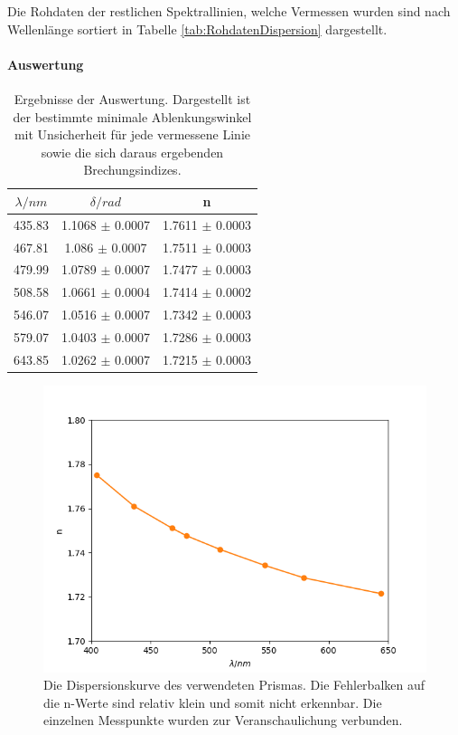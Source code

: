 \documentclass[12pt,a4paper]{article}
\begin{document}
	
	Die Rohdaten der restlichen Spektrallinien, welche Vermessen wurden sind nach Wellenlänge sortiert in Tabelle \ref{tab:RohdatenDispersion} dargestellt.
	
	
	\paragraph{Auswertung}
	
	\begin{table}
		\begin{center}
			\begin{tabular}{|c|c|c|}
				\hline
				$\lambda /nm$ & $\delta /rad$ & n \\
				\hline
				435.83 & 1.1068 $\pm$ 0.0007 & 1.7611 $\pm$ 0.0003 \\ 
				\hline
				467.81 & 1.086 $\pm$ 0.0007 & 1.7511 $\pm$ 0.0003 \\
				\hline
				479.99 & 1.0789 $\pm$ 0.0007 & 1.7477 $\pm$ 0.0003 \\
				\hline
				508.58 & 1.0661 $\pm$ 0.0004 & 1.7414 $\pm$ 0.0002 \\
				\hline
				546.07 & 1.0516 $\pm$ 0.0007 & 1.7342 $\pm$ 0.0003 \\
				\hline
				579.07 & 1.0403 $\pm$ 0.0007 & 1.7286 $\pm$ 0.0003 \\
				\hline
				643.85 & 1.0262 $\pm$ 0.0007 & 1.7215 $\pm$ 0.0003 \\ 
				\hline
			\end{tabular}
			\caption{Ergebnisse der Auswertung. Dargestellt ist der bestimmte minimale Ablenkungswinkel mit Unsicherheit für jede vermessene Linie sowie die sich daraus ergebenden Brechungsindizes.}
			\label{tab:AuswertungDispersion}
		\end{center}
	\end{table}
	
	\begin{figure}
		\includegraphics[scale=1.0]{Bilder/Dispersionskurve.png}
		\caption{Die Dispersionskurve des verwendeten Prismas. Die Fehlerbalken auf die n-Werte sind relativ klein und somit nicht erkennbar. Die einzelnen Messpunkte wurden zur Veranschaulichung verbunden.}\label{fig:Dispersionskurve}
	\end{figure}
	
\end{document}
